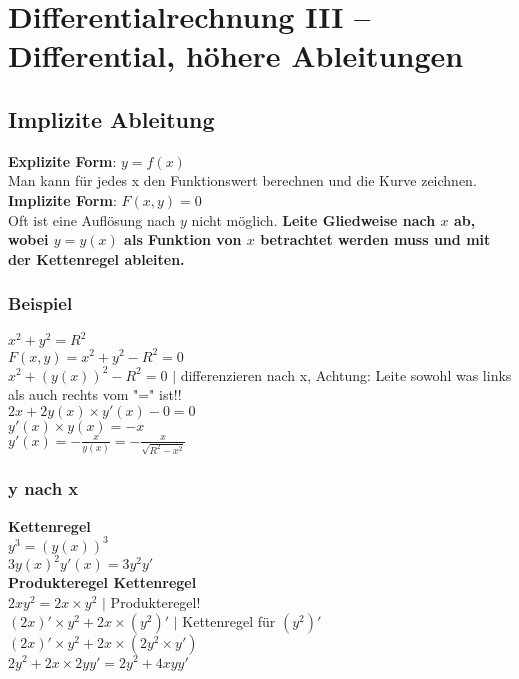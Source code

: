 \documentclass[../main.tex]{subfiles}
\begin{document}

\chapter{Differentialrechnung III -- Differential, höhere Ableitungen}

\section{Implizite Ableitung}
\textbf{Explizite Form}: $y = f(x)$ \\ [7pt]
Man kann für jedes x den Funktionswert berechnen und die Kurve zeichnen. \\ [7pt]
\textbf{Implizite Form}: $F(x,y) = 0$ \\ [7pt]
Oft ist eine Auflösung nach $y$ nicht möglich. \textbf{Leite Gliedweise nach $x$ ab, wobei $y = y(x)$ als Funktion von $x$ betrachtet werden muss und mit der Kettenregel ableiten.}

\subsection{Beispiel}
$x^2 + y^2 = R^2$ \\ [7pt]
$F(x,y) = x^2 + y^2 -R^2 = 0$ \\ [7pt]
$x^2 + (y(x))^2 -R^2 = 0$ $|$ differenzieren nach x, Achtung: Leite sowohl was links als auch rechts vom "=" ist!! \\ [7pt]
$2x + 2y(x) \times y'(x) -0 = 0$ \\ [7pt]
$y'(x) \times y(x) = -x$ \\ [7pt]
$y'(x) = -\frac{x}{y(x)} = -\frac{x}{\sqrt{R^2-x^2}}$

\subsection{y nach x}
\textbf{Kettenregel} \\ [7pt]
$y^3 = (y(x))^3$ \\ [7pt]
$3y(x)^2y'(x) = 3y^2y'$ \\ [14pt]
\textbf{Produkteregel Kettenregel} \\ [7pt]
$2xy^2 = 2x \times y^2$ $|$ Produkteregel!  \\ [7pt]
$(2x)' \times y^2 + 2x \times (y^2)'$ $|$ Kettenregel für $(y^2)'$\\ [7pt]
$(2x)' \times y^2 + 2x \times (2y^2 \times y')$ \\ [7pt]
$2y^2 + 2x \times 2yy' = 2y^2+4xyy'$
\end{document}
